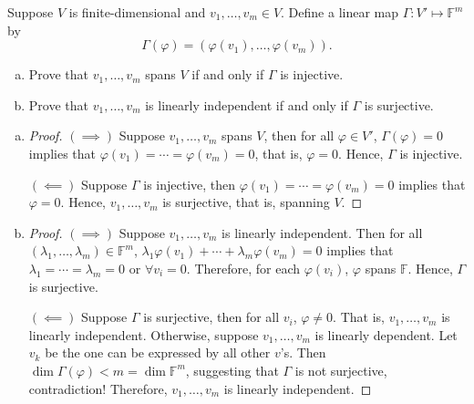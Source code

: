 \begin{exercise}
Suppose $V$ is finite-dimensional and $v_1, \ldots , v_m \in V$. Define a linear map $\Gamma : V' \mapsto \mathbb{F}^{m}$ by \[
	\Gamma(\varphi) = (\varphi(v_1), \ldots , \varphi(v_m)).\]
\begin{enumerate}[(a)]
	\item Prove that $v_1, \ldots , v_m$ spans $V$ if and only if $\Gamma$ is injective.
	\item Prove that $v_1, \ldots , v_m$ is linearly independent if and only if $\Gamma$ is surjective.
\end{enumerate}
\end{exercise}
\begin{enumerate}[(a)]
	\item \begin{proof}
		      $(\implies)$ Suppose $v_1, \ldots, v_m$ spans $V$, then for all $\varphi \in V'$, $\Gamma(\varphi) = 0$ implies that $\varphi(v_1) = \cdots = \varphi(v_m) = 0$, that is, $\varphi = 0$. Hence, $\Gamma$ is injective. \par
		      $(\impliedby)$ Suppose $\Gamma$ is injective, then $\varphi(v_1) = \cdots = \varphi(v_m) = 0$ implies that $\varphi = 0$. Hence, $v_1, \ldots , v_m$ is surjective, that is, spanning $V$.
	      \end{proof}
	\item \begin{proof}
		      $(\implies)$ Suppose $v_1, \ldots , v_m$ is linearly independent. Then for all $(\lambda_1, \ldots , \lambda_m) \in \mathbb{F}^m$, $\lambda_1\varphi(v_1) + \cdots + \lambda_m\varphi(v_m) = 0$ implies that $\lambda_1 = \cdots = \lambda_m = 0$ or $\forall v_i = 0$. Therefore, for each $\varphi(v_i)$, $\varphi$ spans $\mathbb{F}$. Hence, $\Gamma$ is surjective. \par
		      $(\impliedby)$ Suppose $\Gamma$ is surjective, then for all $v_i$, $\varphi \neq 0.$ That is, $v_1, \ldots , v_m$ is linearly independent. Otherwise, suppose $v_1, \ldots ,v_m$ is linearly dependent. Let $v_k$ be the one can be expressed by all other $v$'s. Then $\operatorname{dim}\Gamma(\varphi) < m = \operatorname{dim} \mathbb{F}^m$, suggesting that $\Gamma$ is not surjective, contradiction! Therefore, $v_1, \ldots ,v_m$ is linearly independent.
	      \end{proof}
\end{enumerate}

